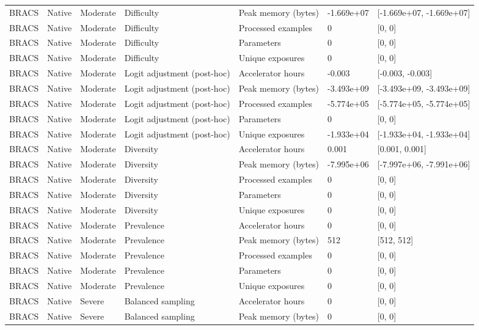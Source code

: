 \begin{longtable}{lllllll}
BRACS & Native & Moderate & Difficulty & Peak memory (bytes) & -1.669e+07 & [-1.669e+07, -1.669e+07] \\
BRACS & Native & Moderate & Difficulty & Processed examples & 0 & [0, 0] \\
BRACS & Native & Moderate & Difficulty & Parameters & 0 & [0, 0] \\
BRACS & Native & Moderate & Difficulty & Unique exposures & 0 & [0, 0] \\
BRACS & Native & Moderate & Logit adjustment (post-hoc) & Accelerator hours & -0.003 & [-0.003, -0.003] \\
BRACS & Native & Moderate & Logit adjustment (post-hoc) & Peak memory (bytes) & -3.493e+09 & [-3.493e+09, -3.493e+09] \\
BRACS & Native & Moderate & Logit adjustment (post-hoc) & Processed examples & -5.774e+05 & [-5.774e+05, -5.774e+05] \\
BRACS & Native & Moderate & Logit adjustment (post-hoc) & Parameters & 0 & [0, 0] \\
BRACS & Native & Moderate & Logit adjustment (post-hoc) & Unique exposures & -1.933e+04 & [-1.933e+04, -1.933e+04] \\
BRACS & Native & Moderate & Diversity & Accelerator hours & 0.001 & [0.001, 0.001] \\
BRACS & Native & Moderate & Diversity & Peak memory (bytes) & -7.995e+06 & [-7.997e+06, -7.991e+06] \\
BRACS & Native & Moderate & Diversity & Processed examples & 0 & [0, 0] \\
BRACS & Native & Moderate & Diversity & Parameters & 0 & [0, 0] \\
BRACS & Native & Moderate & Diversity & Unique exposures & 0 & [0, 0] \\
BRACS & Native & Moderate & Prevalence & Accelerator hours & 0 & [0, 0] \\
BRACS & Native & Moderate & Prevalence & Peak memory (bytes) & 512 & [512, 512] \\
BRACS & Native & Moderate & Prevalence & Processed examples & 0 & [0, 0] \\
BRACS & Native & Moderate & Prevalence & Parameters & 0 & [0, 0] \\
BRACS & Native & Moderate & Prevalence & Unique exposures & 0 & [0, 0] \\
BRACS & Native & Severe & Balanced sampling & Accelerator hours & 0 & [0, 0] \\
BRACS & Native & Severe & Balanced sampling & Peak memory (bytes) & 0 & [0, 0] \\

\end{longtable}
